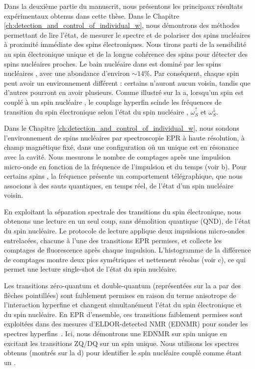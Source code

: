 Dans la deuxième partie du manuscrit, nous présentons les principaux résultats expérimentaux obtenus dans cette thèse. Dans le Chapitre \ref{ch:detection_and_control_of_individual_w}, nous démontrons des méthodes permettant de lire l'état, de mesurer le spectre et de polariser des spins nucléaires à proximité immédiate des spins électroniques. Nous tirons parti de la sensibilité au spin électronique unique et de la longue cohérence des spins \Er pour détecter des spins nucléaires proches. Le bain nucléaire dans \Ca est dominé par les spins nucléaires \W, avec une abondance d'environ $\sim14$\%. Par conséquent, chaque spin \Er peut avoir un environnement différent : certains n'auront aucun \W voisin, tandis que d'autres pourront en avoir plusieurs. Comme illustré sur la a, lorsqu'un spin \Er est couplé à un spin nucléaire \W, le couplage hyperfin scinde les fréquences de transition du spin électronique selon l'état du spin nucléaire \W, $\omega_S^\uparrow$ et $\omega_S^\downarrow$.

Dans le Chapitre \ref{ch:detection_and_control_of_individual_w}, nous sondons l'environnement de spins nucléaires par spectroscopie EPR à haute résolution, à champ magnétique fixé, dans une configuration où un \Er unique est en résonance avec la cavité. Nous mesurons le nombre de comptages après une impulsion micro-onde en fonction de la fréquence de l'impulsion et du temps (voir b). Pour certains spins \Er, la fréquence présente un comportement télégraphique, que nous associons à des sauts quantiques, en temps réel, de l'état d'un spin nucléaire \W voisin.

En exploitant la séparation spectrale des transitions du spin électronique, nous obtenons une lecture en un seul coup, sans démolition quantique (QND), de l'état du spin nucléaire. Le protocole de lecture applique deux impulsions micro-ondes entrelacées, chacune à l'une des transitions EPR permises, et collecte les comptages de fluorescence après chaque impulsion. L'histogramme de la différence de comptages montre deux pics symétriques et nettement résolus (voir c), ce qui permet une lecture single-shot de l'état du spin nucléaire.

Les transitions zéro-quantum et double-quantum (représentées sur la a par des flèches pointillées) sont faiblement permises en raison du terme anisotrope de l'interaction hyperfine et changent simultanément l'état du spin électronique et du spin nucléaire. En EPR d'ensemble, ces transitions faiblement permises sont exploitées dans des mesures d'ELDOR-detected NMR (EDNMR) pour sonder les spectres hyperfins~. Ici, nous démontrons une EDNMR sur spin unique en excitant les transitions ZQ/DQ sur un spin \Er unique. Nous utilisons les spectres obtenus (montrés sur la d) pour identifier le spin nucléaire couplé comme étant un \W.

